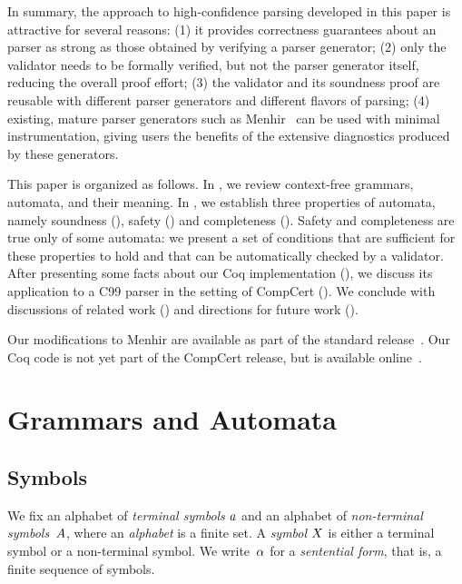 \documentclass{llncs}
\begin{document}
In summary, the approach to high-confidence parsing developed in this
paper is attractive for several reasons:
(1) it provides correctness guarantees about an \lrone parser as
strong as those obtained by verifying a \lrone parser generator;
(2) only the validator needs to be formally verified, but not the
parser generator itself, reducing the overall proof effort;
(3) the validator and its soundness proof are reusable with
different parser generators and different flavors of \lrone parsing;
(4) existing, mature parser generators such as Menhir~\cite{menhir} can be used
with minimal instrumentation, giving users the benefits of the
extensive diagnostics produced by these generators.

This paper is organized as follows. In , we review
context-free grammars, \lrone automata, and their meaning.
In , we establish three properties of automata, namely
soundness (), safety () and completeness
(). Safety and completeness are true only of some
automata: we present a set of conditions that are sufficient for these
properties to hold and that can be automatically checked by a validator.
After presenting some facts about our Coq implementation (), we
discuss its application to a C99 parser in the setting of CompCert
(). We conclude with discussions of related work
() and directions for future work ().

Our modifications to Menhir are available as part of the standard
release~\cite{menhir}.  Our Coq code is not yet part of the CompCert release,
but is available online~\cite{coq-code}.

\section{Grammars and Automata}
\label{sec:defs}

\subsection{Symbols}

We fix an alphabet of \emph{terminal symbols} $a$ and an alphabet of
\emph{non-terminal symbols}~$A$, where
an \emph{alphabet} is a finite set. A \emph{symbol} $X$ is either a
terminal symbol or a non-terminal symbol.  We write~$\alpha$ for
a \emph{sentential form}, that is, a finite sequence of symbols.
\end{document}
